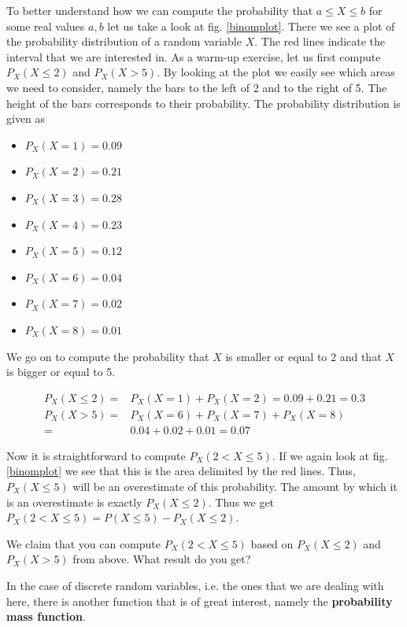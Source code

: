 \documentclass[a4paper,11pt,leqno]{report}
\begin{document}
To better understand how we can compute the probability that $ a \leq X \leq b $ for some real values $ a,b $ let us take a 
look at fig. \ref{binomplot}. There we see a plot of the probability distribution of a random variable $ X $. The red lines
indicate the interval that we are interested in. As a warm-up exercise, let us first compute $ P_{X}(X \leq 2) $ and 
$ P_{X}(X > 5) $. By looking at the plot we easily see which areas we need to consider, namely the bars to the left of 2
and to the right of 5. The height of the bars corresponds to their probability. The probability distribution is given as
\begin{itemize}
\item $ P_{X}(X = 1) = 0.09 $
\item $ P_{X}(X = 2) = 0.21 $
\item $ P_{X}(X = 3) = 0.28 $
\item $ P_{X}(X = 4) = 0.23 $
\item $ P_{X}(X = 5) = 0.12 $
\item $ P_{X}(X = 6) = 0.04 $
\item $ P_{X}(X = 7) = 0.02 $
\item $ P_{X}(X = 8) = 0.01 $
\end{itemize}

We go on to compute the probability that $ X $ is smaller or equal to 2 and that $ X $ is bigger or equal to 5.

\begin{align}
P_{X}(X \leq 2) =& P_{X}(X=1) + P_{X}(X=2) = 0.09 + 0.21 = 0.3 \\
P_{X}(X > 5) =& P_{X}(X=6) + P_{X}(X=7) + P_{X}(X=8) \\ 
=& 0.04 + 0.02 + 0.01 = 0.07 \nonumber
\end{align} 

Now it is straightforward to compute $ P_{X}(2 < X \leq 5) $. If we again look at fig. \ref{binomplot} we see that this is
the area delimited by the red lines. Thus, $ P_{X}(X \leq 5) $ will be an overestimate of this probability. The amount by
which it is an overestimate is exactly $ P_{X}(X \leq 2) $. Thus we get $ P_{X}(2 < X \leq 5) = P(X \leq 5) - P_{X}(X \leq 2) $.

\begin{Exercise}
We claim that you can compute $ P_{X}(2 < X \leq 5) $ based on $ P_{X}(X \leq 2) $ and $ P_{X}(X > 5) $ from above. What result do
you get?
\end{Exercise}

In the case of discrete random variables, i.e. the ones that we are dealing with here, there is another function that is of great 
interest, namely the \textbf{probability mass function}.
\end{document}
